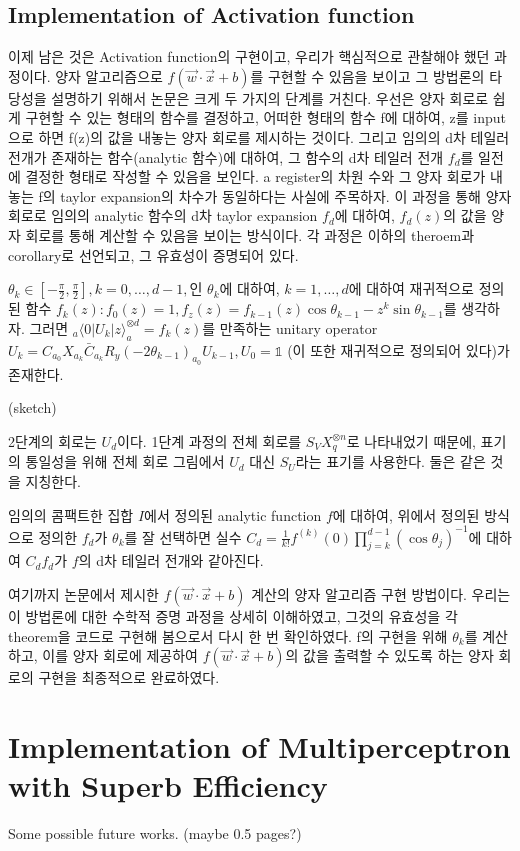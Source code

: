 \subsection{Implementation of Activation function}

이제 남은 것은 Activation function의 구현이고, 우리가 핵심적으로 관찰해야 했던 과정이다.
양자 알고리즘으로 \(f(\vec{w}\cdot\vec{x}+b)\)를 구현할 수 있음을 보이고 그 방법론의 타당성을 설명하기 위해서 논문은 크게 두 가지의 단계를 거친다.
우선은 양자 회로로 쉽게 구현할 수 있는 형태의 함수를 결정하고,
어떠한 형태의 함수 f에 대하여, z를 input으로 하면 f(z)의 값을 내놓는 양자 회로를 제시하는 것이다.
그리고 임의의 d차 테일러 전개가 존재하는 함수(analytic 함수)에 대하여, 그 함수의 d차 테일러 전개 \(f_d\)를 일전에 결정한 형태로 작성할 수 있음을 보인다.
a register의 차원 수와 그 양자 회로가 내놓는 f의 taylor expansion의 차수가 동일하다는 사실에 주목하자.
이 과정을 통해 양자 회로로 임의의 analytic 함수의 d차 taylor expansion \(f_d\)에 대하여, \(f_d(z)\)의 값을 양자 회로를 통해 계산할 수 있음을 보이는 방식이다.
각 과정은 이하의 theroem과 corollary로 선언되고, 그 유효성이 증명되어 있다.

\begin{theorem}
    \(\theta_{k} \in [-\frac{\pi}{2},\frac{\pi}{2}], k = 0,\dots,d-1,\)인 \(\theta_{k}\)에 대하여, \(k = 1,\dots,d\)에 대하여 재귀적으로 정의된 함수 \(f_k(z): f_0(z) = 1, f_z(z) = f_{k-1}(z)\cos\theta_{k-1} - z^k\sin\theta_{k-1}\)를 생각하자.
    그러면 \(_a \langle  0|U_k|z \rangle  _a^{\otimes d} = f_k(z)\)를 만족하는 unitary operator \(U_k = C_{a_0}X_{a_k}\bar{C}_{a_k}R_y(-2\theta_{k-1})_{a_0}U_{k-1}, U_0 = \mathbb{1} \) (이 또한 재귀적으로 정의되어 있다)가 존재한다.
\end{theorem}

\begin{pf}(sketch)
    
    2단계의 회로는 \(U_d\)이다. 1단계 과정의 전체 회로를 \(S_VX_q^{\otimes n}\)로 나타내었기 때문에, 표기의 통일성을 위해 전체 회로 그림에서 \(U_d\) 대신 \(S_U\)라는 표기를 사용한다. 둘은 같은 것을 지칭한다.
    

\end{pf}

\begin{corollary}
    임의의 콤팩트한 집합 \(I\)에서 정의된 analytic function \(f\)에 대하여, 위에서 정의된 방식으로 정의한 \(f_d\)가 \(\theta_k\)를 잘 선택하면 실수 \(C_d = \frac{1}{k!}f^{(k)}(0)\prod_{j=k}^{d-1}(\cos\theta_j)^{-1}\)에 대하여 \(C_df_d\)가 \(f\)의 d차 테일러 전개와 같아진다.
\end{corollary}

여기까지 논문에서 제시한 \(f(\vec{w}\cdot\vec{x}+b)\) 계산의 양자 알고리즘 구현 방법이다.
우리는 이 방법론에 대한 수학적 증명 과정을 상세히 이해하였고, 그것의 유효성을 각 theorem을 코드로 구현해 봄으로서 다시 한 번 확인하였다.
f의 구현을 위해 \(\theta_k\)를 계산하고, 이를 양자 회로에 제공하여 \(f(\vec{w}\cdot\vec{x}+b)\)의 값을 출력할 수 있도록 하는 양자 회로의 구현을 최종적으로 완료하였다.

\section{Implementation of Multiperceptron with Superb Efficiency}
Some possible future works. (maybe 0.5 pages?)